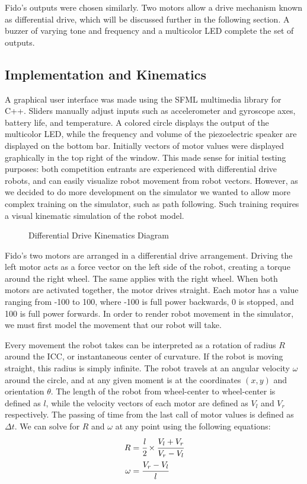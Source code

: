 Fido's outputs were chosen similarly.  Two motors allow a drive mechanism known as differential drive, which will be discussed further in the following section.  A buzzer of varying tone and frequency and a multicolor LED complete the set of outputs.  

\subsection{Implementation and Kinematics}

A graphical user interface was made using the SFML multimedia library for C++.  Sliders manually adjust inputs such as accelerometer and gyroscope axes, battery life, and temperature.  A colored circle displays the output of the multicolor LED, while the frequency and volume of the piezoelectric speaker are displayed on the bottom bar.   Initially vectors of motor values were displayed graphically in the top right of the window.  This made sense for initial testing purposes: both competition entrants are experienced with differential drive robots, and can easily visualize robot movement from robot vectors.  However, as we decided to do more development on the simulator we wanted to allow more complex training on the simulator, such as path following.  Such training requires a visual kinematic simulation of the robot model.

\begin{figure}[ht]
	\centering
	
	\caption{Differential Drive Kinematics Diagram}
\end{figure}

Fido's two motors are arranged in a differential drive arrangement.  Driving the left motor acts as a force vector on the left side of the robot, creating a torque around the right wheel.  The same applies with the right wheel.  When both motors are activated together, the motor drives straight.  Each motor has a value ranging from -100 to 100, where -100 is full power backwards, 0 is stopped, and 100 is full power forwards.   In order to render robot movement in the simulator, we must first model the movement that our robot will take.

Every movement the robot takes can be interpreted as a rotation of radius $R$ around the ICC, or instantaneous center of curvature.   If the robot is moving straight, this radius is simply infinite.   The robot travels at an angular velocity $\omega$ around the circle, and at any given moment is at the coordinates $(x,y)$ and orientation $\theta$.  The length of the robot from wheel-center to wheel-center is defined as $l$, while the velocity vectors of each motor are defined as $V_l$ and $V_r$ respectively.  The passing of time from the last call of motor values is defined as $\Delta t$.  We can solve for $R$ and $\omega$ at any point using the following equations:
\begin{align*}
	R &= \cfrac{l}{2} \times \cfrac{V_l + V_r}{V_r - V_l}\\
	\omega &= \cfrac{V_r - V_l}{l}
\end{align*}

